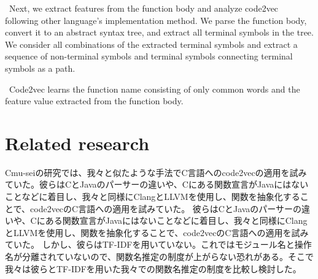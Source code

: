 \documentclass[JIP]{apris}
\begin{document}
 Next, we extract features from the function body and analyze code2vec following other language's implementation method.
We parse the function body, convert it to an abstract syntax tree, and extract all terminal symbols in the tree.
We consider all combinations of the extracted terminal symbols and extract a sequence of non-terminal symbols and terminal symbols connecting terminal symbols as a path.

 Code2vec learns the function name consisting of only common words and the feature value extracted from the function body.

\section{Related research}
Cmu-sei\cite{}の研究では、我々と似たような手法でC言語へのcode2vecの適用を試みていた。彼らはCとJavaのパーサーの違いや、Cにある関数宣言がJavaにはないことなどに着目し、我々と同様にClangとLLVMを使用し、関数を抽象化することで、code2vecのC言語への適用を試みていた。
彼らはCとJavaのパーサーの違いや、Cにある関数宣言がJavaにはないことなどに着目し、我々と同様にClangとLLVMを使用し、関数を抽象化することで、code2vecのC言語への適用を試みていた。
しかし、彼らはTF-IDFを用いていない。これではモジュール名と操作名が分離されていないので、関数名推定の制度が上がらない恐れがある。そこで我々は彼らとTF-IDFを用いた我々での関数名推定の制度を比較し検討した。
\end{document}
